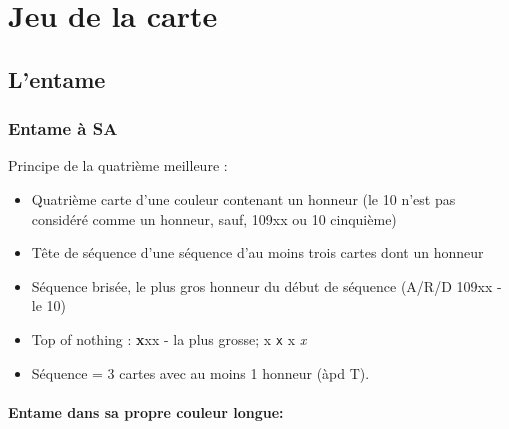 \documentclass[a4paper]{article}
\begin{document}
\section{Jeu de la carte}

\subsection{L'entame}

\subsubsection{Entame à SA}

Principe de la quatrième meilleure :

\begin{itemize}
\item Quatrième carte d'une couleur contenant un honneur (le 10 n'est pas considéré comme un honneur, sauf, 109xx ou 10 cinquième)

\end{itemize}

\begin{itemize}
\item Tête de séquence d'une séquence d'au moins trois cartes dont un honneur

\end{itemize}

\begin{itemize}
\item Séquence brisée, le plus gros honneur du début de séquence (A/R/D 109xx - le 10)

\end{itemize}

\begin{itemize}
\item Top of nothing : \textbf{x}xx - la plus grosse; x \texttt{x} x \emph{x}

\end{itemize}

\begin{itemize}
\item Séquence = 3 cartes avec au moins 1 honneur (àpd T).

\end{itemize}

\paragraph{Entame dans sa propre couleur longue:}
\end{document}
